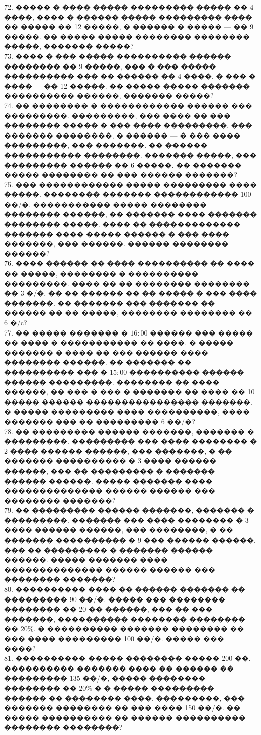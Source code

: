 \documentclass[12pt]{article}
\begin{document}
72. ����� � ���� ����� ��������� ����� �� 4 ����, ���� � ������ ����� ��������� ���� �� ����� �� 12 �����, � ������ � ����� --- �� 9 �����. �� ����� ����� �������� �������� �����, ������� �����?\\
73. ���� � ��� ����� ���������� ������ �������� �� 9 �����, ��� � ��� ����� ���������� ��� �� ������ �� 4 ����, � ��� � ���� --- �� 12 �����. �� ����� ����� ������� ���������� ������, ������� �����?\\
74. �� �������� � ������������ ������ ��� ���������. ���������, ��� ���� �� ��� �������� ����� � ��� ���� ���������, ��� ������� ��������, � ������ --- � ��� ���� ���������, ��� �������. �� ������ ����������� ��������. ������� �����, ��� ��������� ������ �� 6 �����. �� ������� ����� �������� �� ��� ������ �������?\\
75. ��� ������������ ����� ��������� ���� �����. �������� ������� ������������ 100 ��/�. ����������� ����� �������� �������� ������, �� ������� ���� ������� �������� �����. ���� �� ������������� ������� ���� ����� ������ � ��� ���� �������, ��� ������. ������ �������� ������?\\
76. ���� ������ �� ���� ���������� �� ���� �� �����, �������� � ���������� ���������. ���� �� �� �������� �������� �� 3 �/�, �� �� ������ �� �� ����� � ��� ���� �������. �� ������� ��� ������� �� ������ �� �� �����, �������� �������� �� 6 �/c?\\
77. �� ����� ������� � $16:00$ ������ ��� ����� �� ���� � ����������� �� ����. � ����� ������� � ���� �� ��� ������ ���� �������� ������. �� ������� �� ���������� ��� � $15:00$ ���������� ������ ������ ���������. �������� �� ���� ������, �� ��� � ��� � ������� �� ���� �� 10 ����� ������ ���������������� �������. � ����� ��������� ���� ����������, ���� ������� ��� �� ��������� 6 ��/�?\\
78. �� ��������� ������ �������, ������� � ���������. ��������� ��� ���� �������� � 2 ���� ������ ������, ��� �������, � �� ������� ���������� � 3 ���� ������ ������, ��� �� ��������� � ������� ������ ������. ����� ������� ���� �������������� ������ ������ ��� �������� �������?\\
79. �� ��������� ������ �������, ������� � ���������. ������� ��� ���� �������� � 3 ���� ������ ������, ��� ��������, � �� ������� ���������� � 9 ��� ������ ������, ��� �� ��������� � ������� ������ ������. ����� ������� ���� �������������� ������ ������ ��� �������� �������?\\
80. ���������� ���� �� ������ ������� �� ��������� 90 ��/�. ����� ��� �������� �������� ��
20 �� ������, ��� �� ��� �������, ���������� �������� �������� �� $20\%.$ � ���������� �������
�������� �� ��� ���� ��������� 100 ��/�. ����� ��� ����?\\
81.  ���������� ����� �������� ����� 200 ��. ���������� ������� ���� �� ������ �� ���������
135 ��/�, ����� �������� �������� �� $20\%$ � � ����� ��������� ������ �� �������� ����. ���������,
��� ������� �������� �� ��� ���� 150 ��/�. �� ����� ���������� �� ������ ���������� ��������
��������?
\newpage
\end{document}
